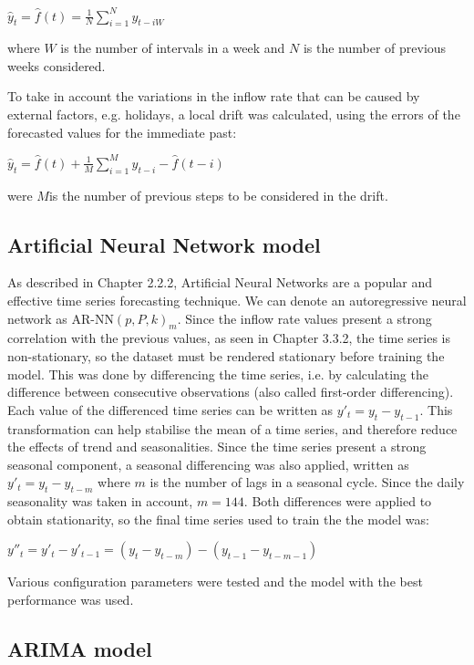 $ \hat{y}_t = \hat{f}(t) = \frac{1}{N} \sum_{i=1}^{N} y_{t-iW} $

where $ W $ is the number of intervals in a week and $ N $ is the number of previous weeks considered.

To take in account the variations in the inflow rate that can be caused by external factors, e.g. holidays, a local drift was calculated, using the errors of the forecasted values for the immediate past:

$ \hat{y}_t = \hat{f}(t) + \frac{1}{M} \sum_{i=1}^{M} y_{t-i} - \hat{f}(t-i) $

were $ M $is the number of previous steps to be considered in the drift.


\subsection{Artificial Neural Network model}
\label{subsec:ann_model}
As described in Chapter 2.2.2, Artificial Neural Networks are a popular and effective time series forecasting technique. We can denote an autoregressive neural network as $ \text{AR-NN}(p, P, k)_m $.
Since the inflow rate values present a strong correlation with the previous values, as seen in Chapter 3.3.2, the time series is non-stationary, so the dataset must be rendered stationary before training the model. This was done by differencing the time series, i.e. by calculating the difference between consecutive observations (also called first-order differencing). Each value of the differenced time series can be written as $ y'_t = y_t - y_{t-1} $. This transformation can help stabilise the mean of a time series, and therefore reduce the effects of trend and seasonalities. Since the time series present a strong seasonal component, a seasonal differencing was also applied, written as $ y'_t = y_t - y_{t-m} $ where $ m $ is the number of lags in a seasonal cycle. Since the daily seasonality was taken in account, $ m = 144 $. Both differences were applied to obtain stationarity, so the final time series used to train the the model was:

$ y''_t = y'_t - y'_{t-1} = (y_t - y_{t-m}) - (y_{t-1} - y_{t-m-1}) $

Various configuration parameters were tested and the model with the best performance was used.

\subsection{ARIMA model}
\label{subsec:arima_model}

